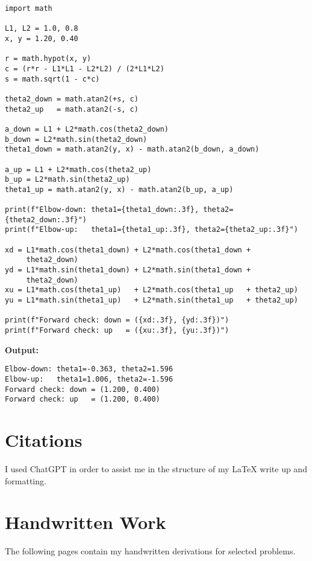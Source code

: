 \documentclass[11pt]{article}
\begin{document}
\begin{lstlisting}[caption={Python Implementation of 2R Planar Arm Inverse Kinematics}]
import math

L1, L2 = 1.0, 0.8
x, y = 1.20, 0.40

r = math.hypot(x, y)
c = (r*r - L1*L1 - L2*L2) / (2*L1*L2)
s = math.sqrt(1 - c*c)

theta2_down = math.atan2(+s, c)
theta2_up   = math.atan2(-s, c)

a_down = L1 + L2*math.cos(theta2_down)
b_down = L2*math.sin(theta2_down)
theta1_down = math.atan2(y, x) - math.atan2(b_down, a_down)

a_up = L1 + L2*math.cos(theta2_up)
b_up = L2*math.sin(theta2_up)
theta1_up = math.atan2(y, x) - math.atan2(b_up, a_up)

print(f"Elbow-down: theta1={theta1_down:.3f}, theta2={theta2_down:.3f}")
print(f"Elbow-up:   theta1={theta1_up:.3f}, theta2={theta2_up:.3f}")

xd = L1*math.cos(theta1_down) + L2*math.cos(theta1_down + 
     theta2_down)
yd = L1*math.sin(theta1_down) + L2*math.sin(theta1_down + 
     theta2_down)
xu = L1*math.cos(theta1_up)   + L2*math.cos(theta1_up   + theta2_up)
yu = L1*math.sin(theta1_up)   + L2*math.sin(theta1_up   + theta2_up)

print(f"Forward check: down = ({xd:.3f}, {yd:.3f})")
print(f"Forward check: up   = ({xu:.3f}, {yu:.3f})")
\end{lstlisting}

\textbf{Output:}
\begin{verbatim}
Elbow-down: theta1=-0.363, theta2=1.596
Elbow-up:   theta1=1.006, theta2=-1.596
Forward check: down = (1.200, 0.400)
Forward check: up   = (1.200, 0.400)
\end{verbatim}

\section*{Citations}
I used ChatGPT in order to assist me in the structure of my LaTeX write up and formatting. 

\appendix
\section*{Handwritten Work}
The following pages contain my handwritten derivations for selected problems.


\end{document}
